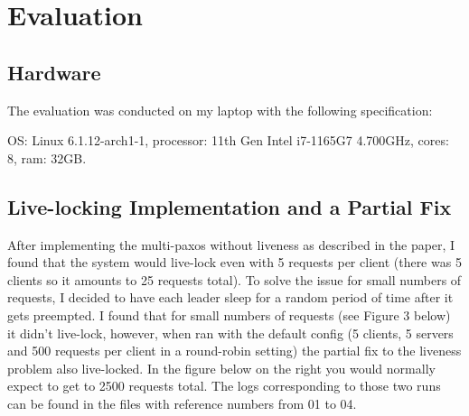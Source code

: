 \documentclass[11pt]{article}
\begin{document}
\section*{Evaluation}
\subsection*{Hardware}
The evaluation was conducted on my laptop with the following specification:

OS: Linux 6.1.12-arch1-1, processor: 11th Gen Intel i7-1165G7 4.700GHz, cores: 8, ram: 32GB.

\subsection*{Live-locking Implementation and a Partial Fix}
After implementing the multi-paxos without liveness as described in the paper,
I found that the system would live-lock even with 5 requests per client (there
was 5 clients so it amounts to 25 requests total). To solve the issue for small
numbers of requests, I decided to have each leader sleep for a random period of
time after it gets preempted. I found that for small numbers of requests (see
Figure 3 below) it didn't live-lock, however, when ran with the default config
(5 clients, 5 servers and 500 requests per client in a round-robin setting) the
partial fix to the liveness problem also live-locked. In the figure below on the
right you would normally expect to get to 2500 requests total. The logs corresponding to
those two runs can be found in the files with reference numbers from 01 to 04.
\end{document}

